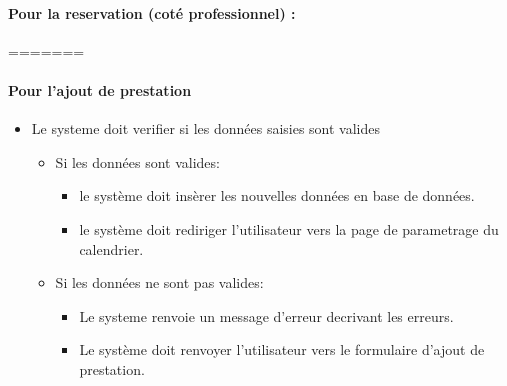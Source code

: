 \documentclass{article}
\begin{document}
\begin{itemize}
\begin{itemize}
\begin{itemize}
\paragraph{Pour la reservation (coté professionnel) :}
=======
\end{itemize}


\paragraph{Pour l'ajout de prestation}
\begin{itemize}
\item Le systeme doit verifier si les données saisies sont valides
	\begin{itemize}
	\item Si les données sont valides:
		\begin{itemize}
		\item le système doit insèrer les nouvelles données en base
                  de données.
                  \item le système doit rediriger l'utilisateur vers
                    la page de parametrage du calendrier.
		\end{itemize}
		\item Si les données ne sont pas valides:
		\begin{itemize}
		\item Le systeme renvoie un message d'erreur decrivant
                  les erreurs.
                \item Le système doit renvoyer l'utilisateur vers le
                  formulaire d'ajout de prestation.
		\end{itemize}
	\end{itemize}
\end{itemize}



\end{itemize}
\end{itemize}
\end{document}
